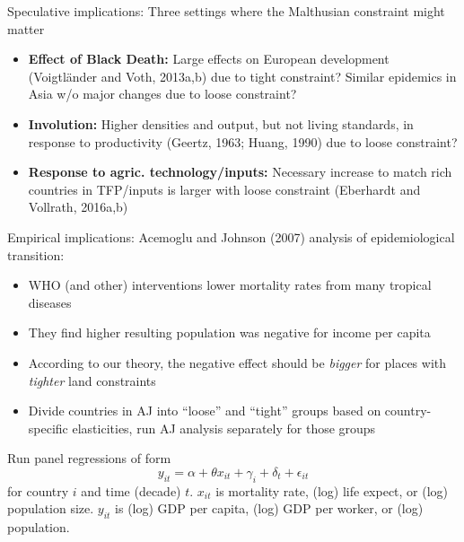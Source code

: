 \documentclass[10pt, xcolor=dvipsnames]{beamer}
\begin{document}
\begin{frame}{Speculative implications:}
Three settings where the Malthusian constraint might matter
\begin{itemize}
  \item \textbf{Effect of Black Death:} Large effects on European development (Voigtl{\"a}nder and Voth, 2013a,b) due to tight constraint? Similar epidemics in Asia w/o major changes due to loose constraint?
  \item \textbf{Involution:} Higher densities and output, but not living standards, in response to productivity (Geertz, 1963; Huang, 1990) due to loose constraint?
  \item \textbf{Response to agric. technology/inputs:} Necessary increase to match rich countries in TFP/inputs is larger with loose constraint (Eberhardt and Vollrath, 2016a,b)
\end{itemize}
\end{frame}

\begin{frame}{Empirical implications:}
Acemoglu and Johnson (2007) analysis of epidemiological transition:
\begin{itemize}
  \item WHO (and other) interventions lower mortality rates from many tropical diseases
  \item They find higher resulting population was negative for income per capita
  \item According to our theory, the negative effect should be \textit{bigger} for places with \textit{tighter} land constraints
  \item Divide countries in AJ into ``loose'' and ``tight'' groups based on country-specific elasticities, run AJ analysis separately for those groups
\end{itemize}

Run panel regressions of form
\begin{equation}
    y_{it} = \alpha + \theta x_{it} + \gamma_i + \delta_t + \epsilon_{it}
\end{equation}
for country $i$ and time (decade) $t$. $x_{it}$ is mortality rate, (log) life expect, or (log) population size. $y_{it}$ is (log) GDP per capita, (log) GDP per worker, or (log) population.

\end{frame}
\end{document}
